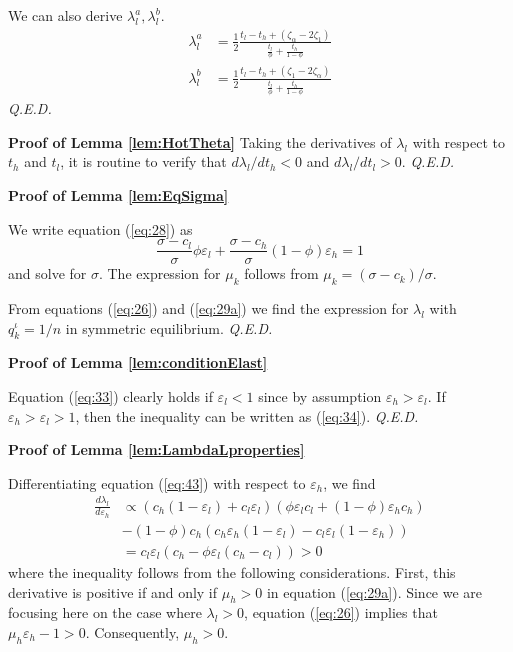 \documentclass[12pt,english,a4paper]{article}
\newcommand{\qed}{\hspace*{\fill} {\em Q.E.D.}}
\begin{document}
We can also derive \(\lambda_{l}^a,\lambda_{l}^b\).
\begin{align}
\label{eq:48}
\lambda_{l}^a &= \frac{1}{2} \frac{t_l - t_h + (\zeta_{\alpha} - 2\zeta_1)}{\frac{t_l}{\phi}+\frac{t_h}{1-\phi}} \\
\label{eq:48b}
\lambda_{l}^b &= \frac{1}{2} \frac{t_l - t_h + (\zeta_{1} - 2\zeta_{\alpha})}{\frac{t_l}{\phi}+\frac{t_h}{1-\phi}}
\end{align}
\qed


\textbf{Proof of Lemma \ref{lem:HotTheta}}
Taking the derivatives of \(\lambda_l\) with respect to \(t_h\) and \(t_l\), it is routine to verify that \(d\lambda_l/d t_h <0\) and \(d\lambda_l/dt_l > 0\).\qed

\textbf{Proof of Lemma \ref{lem:EqSigma}}

We write equation (\ref{eq:28}) as
\begin{equation}
\label{eq:31}
\frac{\sigma-c_l}{\sigma}\phi \varepsilon_l+\frac{\sigma-c_h}{\sigma}(1-\phi) \varepsilon_h = 1
\end{equation}
and solve for \(\sigma\). The expression for \(\mu_k\) follows from \(\mu_k=(\sigma-c_k)/\sigma\).

From equations (\ref{eq:26}) and (\ref{eq:29a}) we find the expression for \(\lambda_l\) with \(q_k^{\iota}=1/n\) in symmetric equilibrium.\qed


\textbf{Proof of Lemma \ref{lem:conditionElast}}

Equation (\ref{eq:33}) clearly holds if \(\varepsilon_l < 1\) since by assumption \(\varepsilon_h > \varepsilon_l\).
If \(\varepsilon_{h} > \varepsilon_l > 1\), then the inequality can be written as (\ref{eq:34}).\qed

\textbf{Proof of Lemma \ref{lem:LambdaLproperties}}

Differentiating equation (\ref{eq:43}) with respect to \(\varepsilon_h\), we find
\begin{align*}
\frac{d \lambda_l}{d \varepsilon_h} &\propto (c_h (1-\varepsilon_l)+c_l \varepsilon_l) (\phi \varepsilon_l c_l + (1-\phi) \varepsilon_hc_h)\\
  & - (1-\phi) c_h (c_h \varepsilon_h (1-\varepsilon_l) - c_l \varepsilon_l(1-\varepsilon_h)) \\
 &= c_l \varepsilon_l (c_h - \phi \varepsilon_l (c_h-c_l)) > 0
\end{align*}
where the inequality follows from the following considerations. First, this derivative is positive if and only if \(\mu_h >0\) in equation (\ref{eq:29a}). Since we are focusing here on the case where \(\lambda_l >0\), equation (\ref{eq:26}) implies that \(\mu_h \varepsilon_h - 1>0\). Consequently, \(\mu_h >0\).
\end{document}

